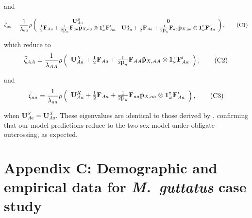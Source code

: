 \documentclass[11pt,draft]{article}
\newcommand\numberthis{\addtocounter{equation}{1}\tag{\theequation}}
\def\mbf#1{\mathbf{#1}}
\newcommand{\tr}{{\mbox{\tiny \sf T}}}
\begin{document}
\noindent and

\begin{align*} \label{eq:eigaaOut}
	\tilde{\zeta}_{aa} = 
		\frac{1}{\lambda_{aa}}\rho\left(\begin{array}{cc}
\mathbf{U}^S_{Aa}  & \mathbf{0} \\
 \frac{1}{2} \mbf{F}_{Aa}+\frac{1}{2\mbox{p}_{n}}\mbf{F}_{aa} \hat{\mbf{p}}_{X,aa} \otimes \mathbf{1}^\tr_{\omega} \mathbf{F}_{Aa}^\prime &\mathbf{U}^X_{Aa} + \frac{1}{2} \mbf{F}_{Aa} +\frac{1}{2\mbox{p}_{n}} \mbf{F}_{aa} \hat{\mbf{p}}_{X,aa} \otimes \mathbf{1}^\tr_{\omega} \mathbf{F}_{Aa}^\prime
			\end{array} \right), \numberthis
\end{align*}

\noindent which reduce to 
\begin{align*} \label{eq:eigAATwoSex}
	\tilde{\zeta}_{AA} = 
		\frac{1}{\lambda_{AA}}\rho\left(\begin{array}{c}
\mathbf{U}^X_{Aa} + \frac{1}{2} \mbf{F}_{Aa} +\frac{1}{2\mbox{p}_{n}} \mbf{F}_{AA} \hat{\mbf{p}}_{X,AA} \otimes \mathbf{1}^\tr_{\omega} \mathbf{F}_{Aa}^\prime
			\end{array} \right), \numberthis
\end{align*}

\noindent and 
\begin{align*} \label{eq:eigaaTwoSex}
	\tilde{\zeta}_{aa} = 
		\frac{1}{\lambda_{aa}}\rho\left(\begin{array}{c}
\mathbf{U}^X_{Aa} + \frac{1}{2} \mbf{F}_{Aa} +\frac{1}{2\mbox{p}_{n}} \mbf{F}_{aa} \hat{\mbf{p}}_{X,aa} \otimes \mathbf{1}^\tr_{\omega} \mathbf{F}_{Aa}^\prime
			\end{array} \right), \numberthis
\end{align*}

\noindent when $\mathbf{U}^S_{Aa}=\mathbf{U}^X_{Aa}$. These eigenvalues are identical to those derived by \citet{deVriesCaswell2019a}, confirming that our model predictions reduce to the two-sex model under obligate outcrossing, as expected.




\section*{Appendix C: Demographic and empirical data for {\itshape M.~guttatus} case study}
\renewcommand{\theequation}{C\arabic{equation}}
\renewcommand{\thetable}{C\arabic{table}}
\setcounter{equation}{0}  %
\setcounter{table}{0}  %
\end{document}
